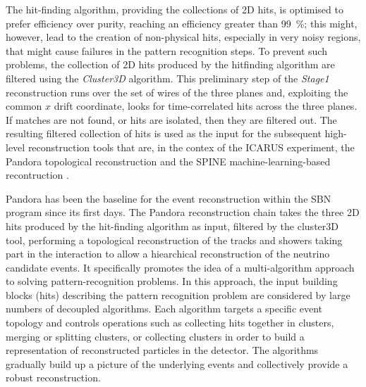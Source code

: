 The hit-finding algorithm, providing the collections of 2D hits, is optimised to prefer efficiency over purity, reaching an efficiency greater than \SI{99}{\percent}; this might, however, lead to the creation of non-physical hits, especially in very noisy regions, that might cause failures in the pattern recognition steps. To prevent such problems, the collection of 2D hits produced by the hitfinding algorithm are filtered using the \emph{Cluster3D} algorithm. This preliminary step of the \emph{Stage1} reconstruction runs over the set of wires of the three planes and, exploiting the common $x$ drift coordinate, looks for time-correlated hits across the three planes. If matches are not found, or hits are isolated, then they are filtered out. The resulting filtered collection of hits is used as the input for the subsequent high-level reconstruction tools that are, in the contex of the ICARUS experiment, the Pandora topological reconstruction \cite{MicroBooNE:2017xvs} and the SPINE machine-learning-based recontruction \cite{Drielsma:2021jdv}. 



Pandora has been the baseline for the event reconstruction within the SBN program since its first days. The Pandora reconstruction chain takes the three 2D hits produced by the hit-finding algorithm as input, filtered by the cluster3D tool, performing a topological reconstruction of the tracks and showers taking part in the interaction to allow a hiearchical reconstruction of the neutrino candidate events. It specifically promotes the idea of a multi-algorithm approach to solving pattern-recognition problems. In this approach, the input building blocks (hits) describing the pattern recognition problem are considered by large numbers of decoupled algorithms. Each algorithm targets a specific event topology and controls operations such as collecting hits together in clusters, merging or splitting clusters, or collecting clusters in order to build a representation of reconstructed particles in the detector. The algorithms gradually build up a picture of the underlying events and collectively provide a robust reconstruction. %


